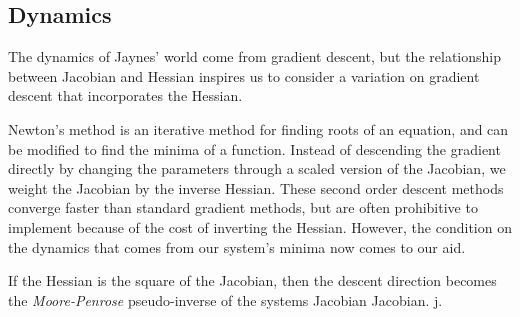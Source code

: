\documentclass[11pt,a4paper]{article}
\begin{document}
\subsection{Dynamics}

The dynamics of Jaynes' world come from gradient descent, but the relationship between Jacobian and Hessian inspires us to consider a variation on gradient descent that incorporates the Hessian.

Newton's method is an iterative method for finding roots of an equation, and can be modified to find the minima of a function. Instead of descending the gradient directly by changing the parameters through a scaled version of the Jacobian, we weight the Jacobian by the inverse Hessian. These second order descent methods converge faster than standard gradient methods, but are often prohibitive to implement because of the cost of inverting the Hessian. However, the condition on the dynamics that comes from our system's minima now comes to our aid.

If the Hessian is the square of the Jacobian, then the descent direction becomes the \emph{Moore-Penrose} pseudo-inverse of the systems Jacobian Jacobian. j.

\printbibliography
\end{document}
